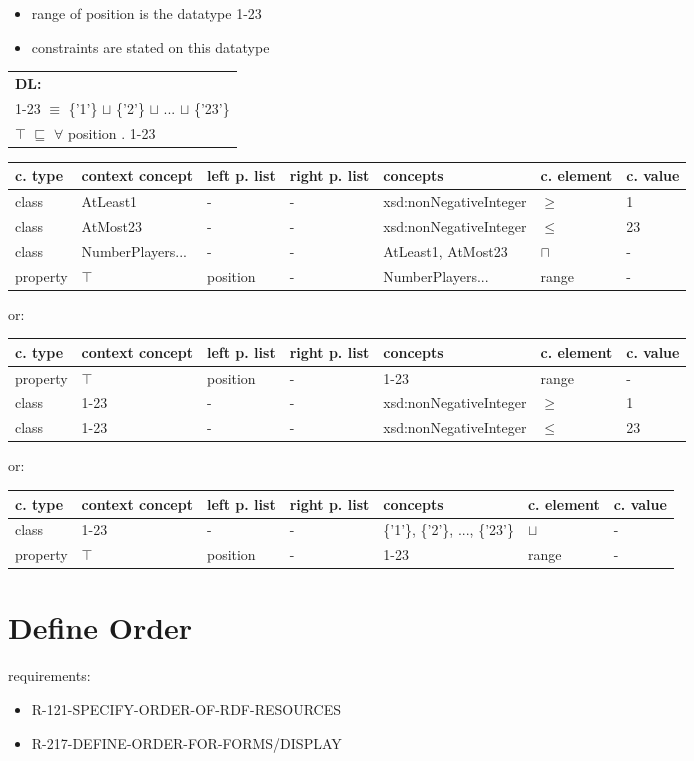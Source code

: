 \documentclass{llncs}
\newenvironment{gcotable}{
  \scriptsize
  \sffamily
  \vspace{0.3cm}
  \begin{tabular}{l|l|l|l|l|l|l}
  \hline
  \textbf{c. type} & \textbf{context concept} & \textbf{left p. list} & \textbf{right p. list} & \textbf{concepts} & \textbf{c. element} & \textbf{c. value} \\
  \hline

}{
  \hline
  \end{tabular}
  \linebreak
}
\newenvironment{DL}{
  \scriptsize
  \sffamily
  \vspace{0.3cm}
  \begin{tabular}{l}
	\textbf{DL:} \\

}{
  \end{tabular}
  \linebreak
}
\begin{document}
\begin{itemize}
	\item range of position is the datatype 1-23
  \item constraints are stated on this datatype
\end{itemize}

\begin{DL}
1-23 $\equiv$ \{'1'\} $\sqcup$ \{'2'\} $\sqcup$ ... $\sqcup$ \{'23'\} \\
$\top$ $\sqsubseteq$ $\forall$ position . 1-23 \\
\end{DL}

\begin{gcotable}
class & AtLeast1 & - & - & xsd:nonNegativeInteger & $\geq$ & 1 \\
class & AtMost23 & - & - & xsd:nonNegativeInteger & $\leq$ & 23 \\
class & NumberPlayers... & - & - & AtLeast1, AtMost23 & $\sqcap$ & - \\
property & $\top$ & position & - & NumberPlayers... & range & - \\
\end{gcotable}

or:

\begin{gcotable}
property & $\top$ & position & - & 1-23 & range & - \\
class & 1-23 & - & - & xsd:nonNegativeInteger & $\geq$ & 1 \\
class & 1-23 & - & - & xsd:nonNegativeInteger & $\leq$ & 23 \\
\end{gcotable}

or:

\begin{gcotable}
class & 1-23 & - & - & \{'1'\}, \{'2'\}, ..., \{'23'\} & $\sqcup$ & - \\
property & $\top$ & position & - & 1-23 & range& - \\
\end{gcotable}

\section{Define Order}

requirements:

\begin{itemize}
  \item R-121-SPECIFY-ORDER-OF-RDF-RESOURCES
	\item R-217-DEFINE-ORDER-FOR-FORMS/DISPLAY
\end{itemize}
\end{document}
